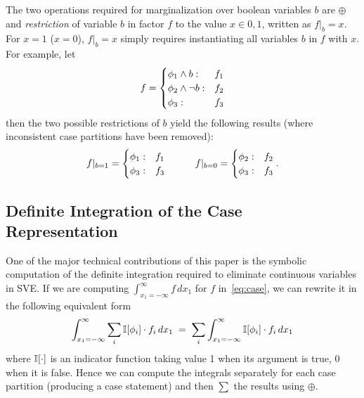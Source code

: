 \documentclass[letterpaper]{article}
\renewcommand{\-}{\text{-}}
\begin{document}
{%
The two operations required for marginalization over boolean variables
$b$ are $\oplus$ and \emph{restriction} of variable $b$ in factor $f$
to the value $x \in {0,1}$, written as $f|_b=x$.
For $x = 1$ ($x = 0$), $f|_b=x$ simply requires instantiating all
variables $b$ in $f$ with $x$.  For example, let
\vspace{-1mm}
\begin{align*}
f = \begin{cases}
    \phi_1 \land b: & f_1 \\ 
    \phi_2 \land \neg b: & f_2 \\ 
    \phi_3 : & f_3 \\ 
  \end{cases}
  \vspace{-3mm}
\end{align*}
then the two possible restrictions of $b$ yield the following 
results (where inconsistent case partitions have been removed):
\vspace{-4mm}
\begin{align*}
f|_{b=1} = \begin{cases}
    \phi_1: & f_1 \\ 
    \phi_3: & f_3 \\ 
  \end{cases}
\hspace{10mm}
f|_{b=0} = \begin{cases}
    \phi_2: & f_2 \\ 
    \phi_3: & f_3 \\ 
  \end{cases}.
  \vspace{-4mm}
\end{align*}

\subsection{Definite Integration of the Case Representation}

\label{sec:def_int}

One of the major technical contributions of this paper is the symbolic
computation of the definite integration required to eliminate
continuous variables in SVE.  If we are 
computing $\int_{x_1=-\infty}^{\infty} f \, dx_1$ for $f$ 
in~\eqref{eq:case}, we can rewrite it in the following equivalent form
\vspace{-2mm}
{\footnotesize
\begin{equation}
\int_{x_1=-\infty}^{\infty} \sum_i \I[\phi_i] \cdot f_i \, dx_1 \; = \; \sum_i \int_{x_1=-\infty}^{\infty} \I[\phi_i] \cdot f_i \, dx_1 \label{eq:int_decomp}
\vspace{-1mm}
\end{equation}
}
where $\mathbb{I}[\cdot]$ is an indicator function taking value 1 when
its argument is true, 0 when it is false.  Hence we can compute
the integrals separately for each case partition (producing a 
case statement) and then $\sum$ the results using $\oplus$.

}
\end{document}
